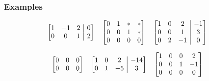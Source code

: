 \documentclass[12pt,t]{beamer}
\makeatletter
\newenvironment{amatrix}[1]{%
  \left[\begin{array}{@{}*{#1}{c}|c@{}}
}{%
  \end{array}\right]
}
\makeatother
\begin{document}
\begin{frame}\frametitle{Examples}
 \[
  \begin{amatrix}{3}
   1 &-1& 2& 0\\
   0 & 0& 1&2
  \end{amatrix}\quad
  \begin{bmatrix}
   0 & 1 & \ast & \ast\\
   0 & 0 & 1 & \ast\\
   0 & 0 & 0 & 0
  \end{bmatrix}\quad
  \begin{amatrix}{3}
   1 & 0 & 2 & -1\\
   0 & 0 & 1 & 3 \\
   0 & 2 & -1 & 0
  \end{amatrix}
 \]

\vspace{0.5in}

\[
 \begin{bmatrix}
  0 & 0 & 0\\
  0 & 0 & 0
 \end{bmatrix}\quad
\begin{amatrix}{3}
 1 & 0 & 2 & -14\\
 0 & 1 & -5 & 3
\end{amatrix}\quad
\begin{bmatrix}
 1 & 0 & 0 & 2\\
 0 & 0 & 1 & -1\\
 0 & 0 & 0 & 0
\end{bmatrix}
\]
\end{frame}
\end{document}
